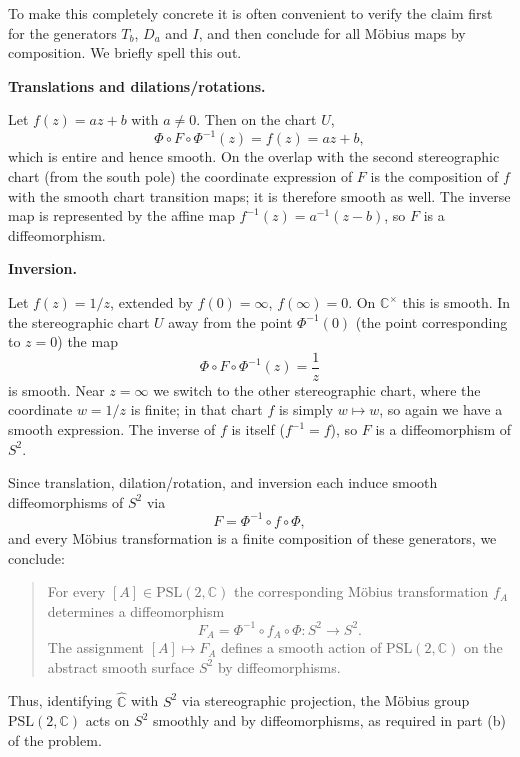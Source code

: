 \begin{solution}
	To make this completely concrete it is often convenient to verify the claim
	first for the generators $T_b$, $D_a$ and $I$, and then conclude for all
	M\"{o}bius maps by composition.  We briefly spell this out.
	
	\par\medskip\noindent\textbf{Translations and dilations/rotations.}\par\smallskip

	Let $f(z)=az+b$ with $a\neq 0$.  Then on the chart $U$,
	\[
	\Phi\circ F\circ\Phi^{-1}(z) = f(z) = az+b,
	\]
	which is entire and hence smooth.  On the overlap with the second
	stereographic chart (from the south pole) the coordinate expression of $F$
	is the composition of $f$ with the smooth chart transition maps; it is
	therefore smooth as well.  The inverse map is represented by the affine map
	$f^{-1}(z) = a^{-1}(z-b)$, so $F$ is a diffeomorphism.
	
	\par\medskip\noindent\textbf{Inversion.}\par\smallskip

	Let $f(z) = 1/z$, extended by $f(0)=\infty$, $f(\infty)=0$.  On
	$\mathbb{C}^{\times}$ this is smooth.  In the stereographic chart $U$ away
	from the point $\Phi^{-1}(0)$ (the point corresponding to $z=0$) the map
	\[
	\Phi\circ F\circ\Phi^{-1}(z)=\frac{1}{z}
	\]
	is smooth.  Near $z=\infty$ we switch to the other stereographic chart,
	where the coordinate $w=1/z$ is finite; in that chart $f$ is simply
	$w\mapsto w$, so again we have a smooth expression.  The inverse of $f$ is
	itself ($f^{-1}=f$), so $F$ is a diffeomorphism of $S^{2}$.
	
	\medskip
	
	Since translation, dilation/rotation, and inversion each induce smooth
	diffeomorphisms of $S^{2}$ via
	\[
	F = \Phi^{-1}\circ f\circ\Phi,
	\]
	and every M\"{o}bius transformation is a finite composition of these generators,
	we conclude:
	
	\begin{quote}
		For every $[A]\in\mathrm{PSL}(2,\mathbb{C})$ the corresponding M\"{o}bius
		transformation $f_A$ determines a diffeomorphism
		\[
		F_A = \Phi^{-1}\circ f_A\circ\Phi : S^{2}\to S^{2}.
		\]
		The assignment $[A]\mapsto F_A$ defines a smooth action of
		$\mathrm{PSL}(2,\mathbb{C})$ on the abstract smooth surface $S^{2}$ by
		diffeomorphisms.
	\end{quote}
	
	Thus, identifying $\widehat{\mathbb{C}}$ with $S^{2}$ via stereographic
	projection, the M\"{o}bius group $\mathrm{PSL}(2,\mathbb{C})$ acts on $S^{2}$
	smoothly and by diffeomorphisms, as required in part (b) of the problem.
\end{solution}

